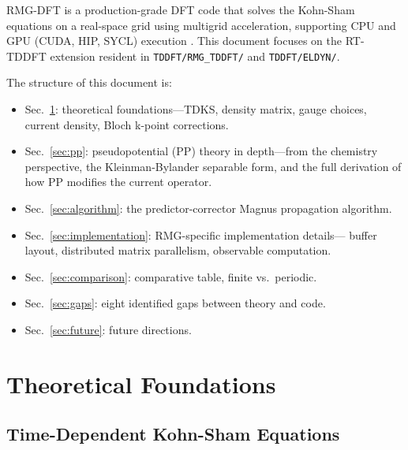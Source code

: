 \documentclass[12pt,letterpaper]{article}
\begin{document}
RMG-DFT is a production-grade DFT code that solves the Kohn-Sham equations on
a real-space grid using multigrid acceleration, supporting CPU and GPU (CUDA,
HIP, SYCL) execution \cite{Briggs1995,Bernholc2008}.  This document focuses
on the RT-TDDFT extension resident in \texttt{TDDFT/RMG\_TDDFT/} and
\texttt{TDDFT/ELDYN/}.

The structure of this document is:
\begin{itemize}
  \item Sec.~\ref{sec:theory}: theoretical foundations---TDKS, density matrix,
    gauge choices, current density, Bloch k-point corrections.
  \item Sec.~\ref{sec:pp}: pseudopotential (PP) theory in depth---from the
    chemistry perspective, the Kleinman-Bylander separable form, and the
    full derivation of how PP modifies the current operator.
  \item Sec.~\ref{sec:algorithm}: the predictor-corrector Magnus propagation
    algorithm.
  \item Sec.~\ref{sec:implementation}: RMG-specific implementation details---
    buffer layout, distributed matrix parallelism, observable computation.
  \item Sec.~\ref{sec:comparison}: comparative table, finite vs.\ periodic.
  \item Sec.~\ref{sec:gaps}: eight identified gaps between theory and code.
  \item Sec.~\ref{sec:future}: future directions.
\end{itemize}

\section{Theoretical Foundations}
\label{sec:theory}

\subsection{Time-Dependent Kohn-Sham Equations}
\label{sec:tdks}
\end{document}
